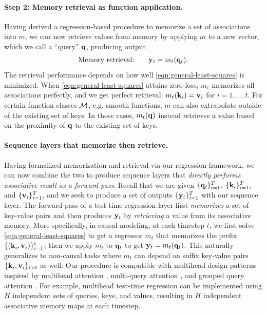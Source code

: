 \documentclass[notitlepage, 11pt]{article}
\newcommand*{\memory}{{m}}
\begin{document}
\paragraph{Step 2: Memory retrieval as function application.}
Having derived a regression-based procedure to memorize a set of associations into $\memory$, we can now retrieve values from memory by applying $\memory$ to a new vector, which we call a ``query'' $\mathbf{q}$, producing output
\begin{align}
    \text{Memory retrieval:} \quad \quad \ybf_t = \memory_t(\qbf_t). 
\end{align}
The retrieval performance depends on how well \autoref{eqn:general-least-squares} is minimized.
When \autoref{eqn:general-least-squares} attains zero-loss, $\memory_t$ memorizes all associations perfectly, and we get perfect retrieval: $\memory_t(\kbf_i) = \vbf_i$ for $i= 1, \ldots, t$.
For certain function classes $\mathcal{M}$, e.g. smooth functions, $\memory$ can also extrapolate outside of the existing set of keys.
In those cases, $\memory_t(\qbf)$ instead retrieves a value based on the proximity of $\mathbf{q}$ to the existing set of keys.













\paragraph{Sequence layers that memorize then retrieve.}
Having formalized memorization and retrieval via our regression framework, we can now combine the two to produce sequence layers that \emph{directly performs associative recall as a forward pass}.
Recall that we are given $\{\mathbf{q}_i\}_{i=1}^T$, $\{\mathbf{k}_i\}_{i=1}^T$, and $\{\mathbf{v}_i\}_{i=1}^T$, and we seek to produce a set of outputs $\{\mathbf{y}_i\}_{i=1}^T$ with our sequence layer.
The forward pass of a test-time regression layer first \emph{memorizes} a set of key-value pairs and then produces $\mathbf{y}_t$ by \emph{retrieving} a value from its associative memory.
More specifically, in causal modeling, at each timestep $t$, we first solve \autoref{eqn:general-least-squares} to get a regressor $\memory_t$ that memorizes the prefix $\{(\mathbf{k}_i, \mathbf{v}_i)\}_{i=1}^t$; then we apply $\memory_t$ to $\mathbf{q}_t$ to get $\ybf_t = \memory_t(\qbf_t)$.
This naturally generalizes to non-causal tasks where $\memory_t$ can depend on suffix key-value pairs $\{\mathbf{k}_i,\mathbf{v}_i\}_{i > t}$ as well.
Our procedure is compatible with multihead design patterns inspired by multihead attention \citep{Vaswani2017AttentionAllYou}, multi-query attention \citep{Shazeer2019FastTransformerDecoding}, and grouped query attention \citep{Ainslie2023GQATrainingGeneralized}.
For example, multihead test-time regression can be implemented using $H$ independent sets of queries, keys, and values, resulting in $H$ independent associative memory maps at each timestep.
\end{document}
